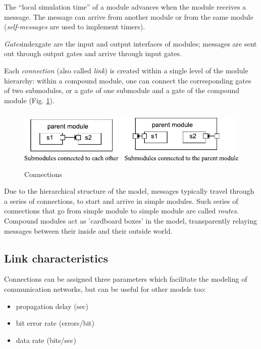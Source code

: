 The ``local simulation time'' of a module advances when the module 
receives a message. The message can arrive from another module 
or from the same module (\textit{self-messages} are used to implement 
timers).


\textit{Gates}index{gate} are the input and output interfaces of
modules; messages are sent out through output gates and arrive through
input gates.

Each \textit{connection} (also called
\textit{link}) is created within a single level of the
module hierarchy: within a compound module, one can connect the
corresponding gates of two submodules, or a gate of one submodule and
a gate of the compound module (Fig.
\ref{fig:ch-overview:connections}).

\begin{figure}[htbp]
\begin{center}
\includegraphics[width=5.061in, height=1.121in]{figures/usmanFig3}
\caption{Connections}
\label{fig:ch-overview:connections}
\end{center}
\end{figure}

Due to the hierarchical structure of the model, messages typically
travel through a series of connections, to start and arrive in simple
modules. Such series of connections that go from simple module to
simple module are called \textit{routes}.  Compound modules act as
'cardboard boxes' in the model, transparently relaying messages
between their inside and their outside world.


\subsection{Link characteristics}

Connections can be assigned three parameters which facilitate 
the modeling of communication networks, but can be useful for 
other models too:
\begin{itemize}
  \item{propagation delay (sec)}
  \item{bit error rate (errors/bit)}
  \item{data rate (bits/sec)}
\end{itemize}


